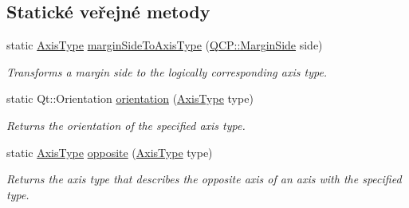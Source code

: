 \subsection*{Statické veřejné metody}
\begin{DoxyCompactItemize}
\item 
static \hyperlink{classQCPAxis_ae2bcc1728b382f10f064612b368bc18a}{Axis\+Type} \hyperlink{classQCPAxis_ac0a6b77bd52bec6c81cd62d167cfeba6}{margin\+Side\+To\+Axis\+Type} (\hyperlink{namespaceQCP_a7e487e3e2ccb62ab7771065bab7cae54}{Q\+C\+P\+::\+Margin\+Side} side)
\begin{DoxyCompactList}\small\item\em Transforms a margin side to the logically corresponding axis type. \end{DoxyCompactList}\item 
static Qt\+::\+Orientation \hyperlink{classQCPAxis_a9a68b3e45f1b1e33d4d807822342516c}{orientation} (\hyperlink{classQCPAxis_ae2bcc1728b382f10f064612b368bc18a}{Axis\+Type} type)
\begin{DoxyCompactList}\small\item\em Returns the orientation of the specified axis type. \end{DoxyCompactList}\item 
\hypertarget{classQCPAxis_aa85ba73dfee6483e23825461b725e363}{}static \hyperlink{classQCPAxis_ae2bcc1728b382f10f064612b368bc18a}{Axis\+Type} \hyperlink{classQCPAxis_aa85ba73dfee6483e23825461b725e363}{opposite} (\hyperlink{classQCPAxis_ae2bcc1728b382f10f064612b368bc18a}{Axis\+Type} type)\label{classQCPAxis_aa85ba73dfee6483e23825461b725e363}

\begin{DoxyCompactList}\small\item\em Returns the axis type that describes the opposite axis of an axis with the specified {\itshape type}. \end{DoxyCompactList}\end{DoxyCompactItemize}
